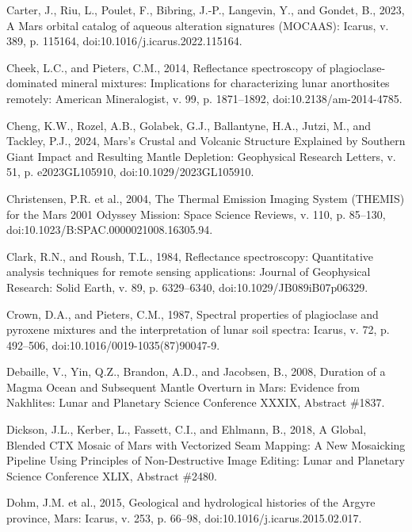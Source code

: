 \documentclass[11pt]{article}
\begin{document}
\begin{thebibliography}{99}
 Carter, J., Riu, L., Poulet, F., Bibring, J.-P., Langevin, Y., and Gondet, B., 2023, A Mars orbital catalog of aqueous alteration signatures (MOCAAS): Icarus, v. 389, p. 115164, doi:10.1016/j.icarus.2022.115164.

 Cheek, L.C., and Pieters, C.M., 2014, Reflectance spectroscopy of plagioclase-dominated mineral mixtures: Implications for characterizing lunar anorthosites remotely: American Mineralogist, v. 99, p. 1871--1892, doi:10.2138/am-2014-4785.

 Cheng, K.W., Rozel, A.B., Golabek, G.J., Ballantyne, H.A., Jutzi, M., and Tackley, P.J., 2024, Mars's Crustal and Volcanic Structure Explained by Southern Giant Impact and Resulting Mantle Depletion: Geophysical Research Letters, v. 51, p. e2023GL105910, doi:10.1029/2023GL105910.

 Christensen, P.R. et al., 2004, The Thermal Emission Imaging System (THEMIS) for the Mars 2001 Odyssey Mission: Space Science Reviews, v. 110, p. 85--130, doi:10.1023/B:SPAC.0000021008.16305.94.

 Clark, R.N., and Roush, T.L., 1984, Reflectance spectroscopy: Quantitative analysis techniques for remote sensing applications: Journal of Geophysical Research: Solid Earth, v. 89, p. 6329--6340, doi:10.1029/JB089iB07p06329.

 Crown, D.A., and Pieters, C.M., 1987, Spectral properties of plagioclase and pyroxene mixtures and the interpretation of lunar soil spectra: Icarus, v. 72, p. 492--506, doi:10.1016/0019-1035(87)90047-9.

 Debaille, V., Yin, Q.Z., Brandon, A.D., and Jacobsen, B., 2008, Duration of a Magma Ocean and Subsequent Mantle Overturn in Mars: Evidence from Nakhlites: Lunar and Planetary Science Conference XXXIX, Abstract \#1837.

 Dickson, J.L., Kerber, L., Fassett, C.I., and Ehlmann, B., 2018, A Global, Blended CTX Mosaic of Mars with Vectorized Seam Mapping: A New Mosaicking Pipeline Using Principles of Non-Destructive Image Editing: Lunar and Planetary Science Conference XLIX, Abstract \#2480.

 Dohm, J.M. et al., 2015, Geological and hydrological histories of the Argyre province, Mars: Icarus, v. 253, p. 66--98, doi:10.1016/j.icarus.2015.02.017.


\end{thebibliography}
\end{document}
